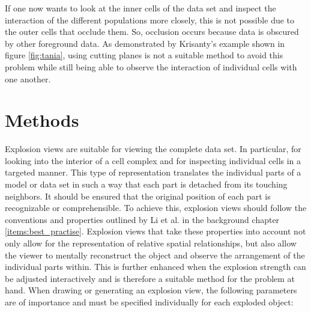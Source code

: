 If one now wants to look at the inner cells of the data set and inspect the interaction of the different populations more closely, this is not possible due to the outer cells that occlude them. 
So, occlusion occurs because data is obscured by other foreground data.
As demonstrated by Krisanty's example shown in figure \ref{fig:tania}, using cutting planes is not a suitable method to avoid this problem while still being able to observe the interaction of individual cells with one another.

\section{Methods}
Explosion views are suitable for viewing the complete data set. In particular, for looking into the interior of a cell complex and for inspecting individual cells in a targeted manner. 
This type of representation translates the individual parts of a model or data set in such a way that each part is detached from its touching neighbors.
It should be ensured that the original position of each part is recognizable or comprehensible. 
To achieve this, explosion views should follow the conventions and properties outlined by Li et al. in the background chapter \ref{items:best_practise}.
Explosion views that take these properties into account not only allow for the representation of relative spatial relationships, but also allow the viewer to mentally reconstruct the object and observe the arrangement of the individual parts within. 
This is further enhanced when the explosion strength can be adjusted interactively and is therefore a suitable method for the problem at hand.
When drawing or generating an explosion view, the following parameters are of importance and must be specified individually for each exploded object:
